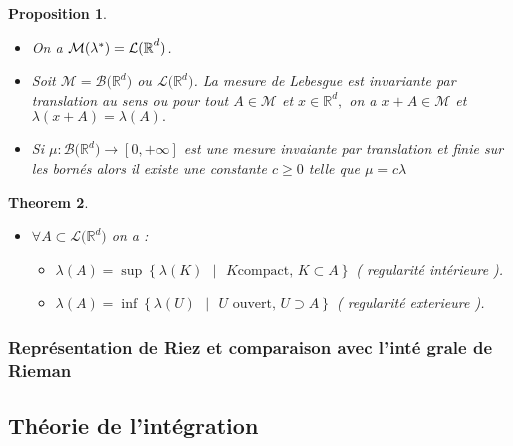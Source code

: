 \documentclass[3pt]{article}
\newtheorem{theorem}{Theorem}
\newtheorem{proposition}[theorem]{Proposition}
\begin{document}
\bigskip 

\begin{proposition}

\begin{itemize}
\item On a $\mathcal{M(}\lambda ^{\ast })=\mathcal{L(\mathbb{R}}^{d}\mathcal{%
)}$.

\item Soit $\mathcal{M=\mathcal{B(}}\mathbb{R}^{d}\mathcal{\mathcal{)}}$ ou $%
\mathcal{L(}\mathbb{R}^{d}\mathcal{)}$. La mesure de Lebesgue est invariante
par translation au sens ou pour tout $A\in \mathcal{M}$ et $x\in \mathbb{R}%
^{d},$ on a $x+A\in \mathcal{M}$ et $\lambda (x+A)=\lambda (A).$

\item Si $\mu :\mathcal{\mathcal{B(}}\mathbb{R}^{d}\mathcal{\mathcal{)}%
\rightarrow }\left[ 0,+\infty \right] $ est une mesure invaiante par
translation et finie sur les born\'{e}s alors il existe une constante $c\geq
0$ telle que $\mu =c\lambda $
\end{itemize}
\end{proposition}

\begin{theorem}
\begin{itemize}
\item $\forall A\subset \mathcal{L(}\mathbb{R}^{d}\mathcal{)}$ on a : 
\newline

\begin{itemize}
\item $\lambda (A)=\sup \left\{ \lambda (K)\text{ }|\text{\ }K\text{
compact, }K\subset A\right\} $ ( regularit\'{e} int\'{e}rieure ).

\item $\lambda (A)=\inf \left\{ \lambda (U)\text{ }|\text{\ }U\text{ ouvert, 
}U\supset A\right\} $ ( regularit\'{e} exterieure ).
\end{itemize}
\end{itemize}
\end{theorem}

\bigskip 

\subsubsection{Repr\'{e}sentation de Riez et comparaison avec l'int\'{e}%
grale de Rieman }

\bigskip 

\subsection{Th\'{e}orie de l'int\'{e}gration}
\end{document}
